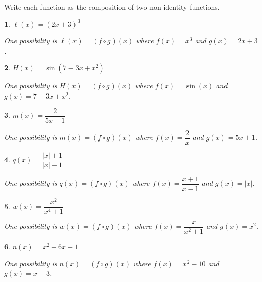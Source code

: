 \documentclass{amsbook}
\newtheorem{exc}{}
\newenvironment{ex}{\begin{exc}\normalfont}{\end{exc}}
\numberwithin{section}{chapter}
\numberwithin{equation}{chapter}
\begin{document}
Write each function as the composition of two non-identity functions.
\begin{multicols}{2}
	\begin{ex}
		$\ell(x) = (2x+3)^3$
		\begin{sol}
			One possibility is $\ell(x) = (f\circ g)(x)$ where $f(x) = x^3$ and $g(x) = 2x+3$.
		\end{sol}
	\end{ex}
	\begin{ex}
	$H(x) = \sin(7-3x+x^2)$
	\begin{sol}
		One possibility is $H(x) = (f\circ g)(x)$ where $f(x) = \sin(x)$ and $g(x) = 7-3x+x^2$.
	\end{sol}
\end{ex}
	\begin{ex}
	$m(x) = \dfrac{2}{5x+1}$
	\begin{sol}
		One possibility is $m(x) = (f\circ g)(x)$ where $f(x) = \dfrac{2}{x}$ and $g(x) = 5x+1$.
	\end{sol}
	\end{ex}
	\begin{ex}
	$q(x) = \dfrac{|x|+1}{|x|-1}$
	\begin{sol}
		One possibility is $q(x) = (f\circ g)(x)$ where $f(x) = \dfrac{x+1}{x-1}$ and $g(x) = |x|$.
	\end{sol}
\end{ex}
	\begin{ex}
	$w(x) = \dfrac{x^2}{x^4+1}$
	\begin{sol}
		One possibility is $w(x) = (f\circ g)(x)$ where $f(x) = \dfrac{x}{x^2+1}$ and $g(x) = x^2$.
	\end{sol}
\end{ex}
	\begin{ex}
	$n(x) = x^2 - 6x-1$
	\begin{sol}
		One possibility is $n(x) = (f\circ g)(x)$ where $f(x) = x^2-10$ and $g(x) = x-3$.
	\end{sol}
\end{ex}
\end{multicols}
\end{document}
